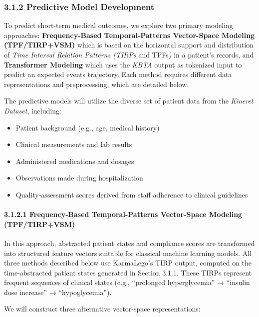 \documentclass[
]{article}
\begin{document}
\subsubsection{3.1.2 Predictive Model
Development}\label{predictive-model-development}

To predict short-term medical outcomes, we explore two primary modeling
approaches: \textbf{Frequency-Based Temporal-Patterns Vector-Space
Modeling (TPF/TIRP+VSM)} which is based on the horizontal support and
distribution of \emph{Time Interval Relation Patterns (TIRPs} and
TPFs\emph{)} in a patient's records, and \textbf{Transformer Modeling}
which uses the \emph{KBTA} output as tokenized input to predict an
expected events trajectory. Each method requires different data
representations and preprocessing, which are detailed below.

The predictive models will utilize the diverse set of patient data from
the \emph{Kineret Dataset}, including:

\begin{itemize}
\item
  Patient background (e.g., age, medical history)
\item
  Clinical measurements and lab results
\item
  Administered medications and dosages
\item
  Observations made during hospitalization
\item
  Quality-assessment scores derived from staff adherence to clinical
  guidelines
\end{itemize}

\paragraph{3.1.2.1 Frequency-Based Temporal-Patterns Vector-Space
Modeling
(TPF/TIRP+VSM)}\label{frequency-based-temporal-patterns-vector-space-modeling-tpftirpvsm}

In this approach, abstracted patient states and compliance scores are
transformed into structured feature vectors suitable for classical
machine learning models. All three methods described below use
KarmaLego's TIRP output, computed on the time-abstracted patient states
generated in Section 3.1.1. These TIRPs represent frequent sequences of
clinical states (e.g., ``prolonged hyperglycemia'' → ``insulin dose
increase'' → ``hypoglycemia'').

We will construct three alternative vector-space representations:
\end{document}
